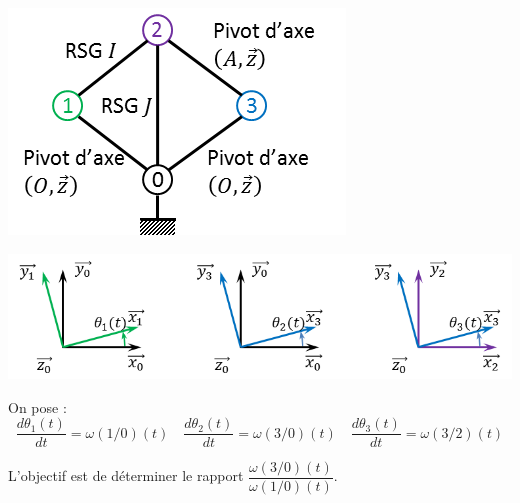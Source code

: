 \documentclass[10pt,oneside]{article}
\begin{document}
\begin{minipage}[c]{.34\linewidth}
\begin{center}
\includegraphics[width=\textwidth]{png/graphe_liaisons}
\end{center}
\end{minipage}\hfill
\begin{minipage}[c]{.64\linewidth}
\begin{center}
\includegraphics[width=.95\textwidth]{png/parametrage_epi}
\end{center}
\end{minipage}
On pose :
$$
\dfrac{d\theta_1(t)}{dt} = \omega(1/0)(t)
\quad
\dfrac{d\theta_2(t)}{dt} =\omega(3/0)(t)
\quad
\dfrac{d\theta_3(t)}{dt} =\omega(3/2)(t)
$$
\begin{obj}
L'objectif est de déterminer le rapport $\dfrac{\omega(3/0)(t)}{\omega(1/0)(t)}$.
\end{obj}
\end{document}
